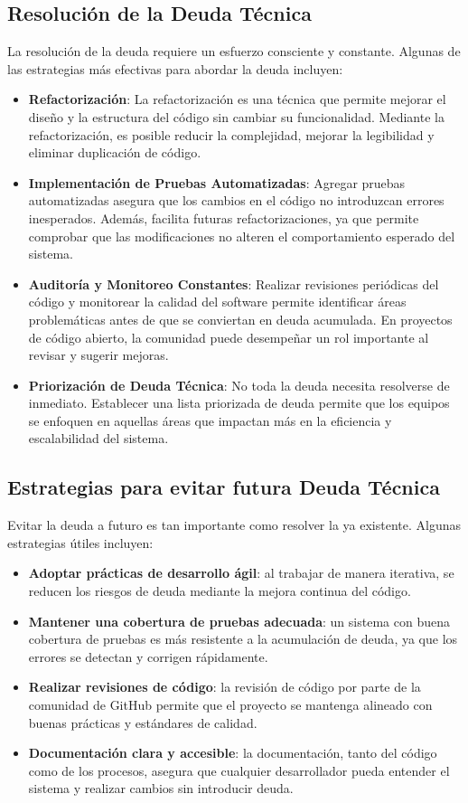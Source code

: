 \subsection{Resolución de la Deuda Técnica}
La resolución de la \gls{deuda} requiere un esfuerzo consciente y constante. Algunas de las estrategias más efectivas para abordar la \gls{deuda} incluyen:

\begin{itemize}
    \item \textbf{Refactorización}: La refactorización es una técnica que permite mejorar el diseño y la estructura del código sin cambiar su funcionalidad. Mediante la refactorización, es posible reducir la complejidad, mejorar la legibilidad y eliminar duplicación de código.
    \item \textbf{Implementación de Pruebas Automatizadas}: Agregar pruebas automatizadas asegura que los cambios en el código no introduzcan errores inesperados. Además, facilita futuras refactorizaciones, ya que permite comprobar que las modificaciones no alteren el comportamiento esperado del sistema.
    \item \textbf{Auditoría y Monitoreo Constantes}: Realizar revisiones periódicas del código y monitorear la calidad del software permite identificar áreas problemáticas antes de que se conviertan en \gls{deuda} acumulada. En proyectos de código abierto, la comunidad puede desempeñar un rol importante al revisar y sugerir mejoras.
    \item \textbf{Priorización de Deuda Técnica}: No toda la \gls{deuda} necesita resolverse de inmediato. Establecer una lista priorizada de \gls{deuda} permite que los equipos se enfoquen en aquellas áreas que impactan más en la eficiencia y escalabilidad del sistema.
\end{itemize}

\subsection{Estrategias para evitar futura Deuda Técnica}
Evitar la \gls{deuda} a futuro es tan importante como resolver la ya existente. Algunas estrategias útiles incluyen:

\begin{itemize}
    \item \textbf{Adoptar prácticas de desarrollo ágil}: al trabajar de manera iterativa, se reducen los riesgos de \gls{deuda} mediante la mejora continua del código.
    \item \textbf{Mantener una cobertura de pruebas adecuada}: un sistema con buena cobertura de pruebas es más resistente a la acumulación de \gls{deuda}, ya que los errores se detectan y corrigen rápidamente.
    \item \textbf{Realizar revisiones de código}: la revisión de código por parte de la comunidad de GitHub permite que el proyecto se mantenga alineado con buenas prácticas y estándares de calidad.
    \item \textbf{Documentación clara y accesible}: la documentación, tanto del código como de los procesos, asegura que cualquier desarrollador pueda entender el sistema y realizar cambios sin introducir \gls{deuda}.
\end{itemize}

